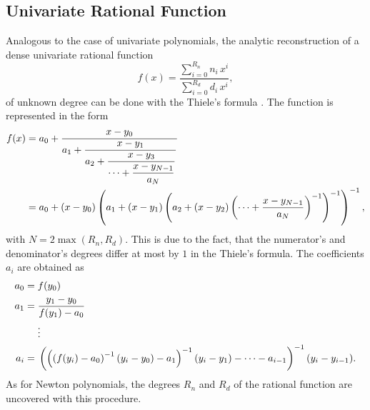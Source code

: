 {\subsection{Univariate Rational Function}
\label{sec:thiele}

Analogous to the case of univariate polynomials,
the analytic reconstruction of a dense univariate rational function 
\begin{equation} \label{eq:defuratfun}
  f(x) = \frac{\sum_{i=0}^{R_n} n_i\, x^i}{\sum_{i=0}^{R_d} d_{i}\, x^{i}},
\end{equation}
of unknown degree can be done with the Thiele's formula  \cite{Abramowitz1964}.
The function is represented in the form
\begin{align} \label{eq:thielerep}
  f(x) = {} & a_0 + \dfrac{x-y_0}{a_1 + \dfrac{x-y_1}{a_2 + \dfrac{x-y_3}{\cdots + \dfrac{x-y_{N-1}}{a_N}}}} \\
       = {} & a_0 + (x-y_0)\left(a_1 + (x-y_1)\left( a_2 + (x-y_2) \left(\cdots+ \frac{x-y_{N-1}}{a_N}\right)^{-1} \right)^{-1} \right)^{-1},
\end{align}
with $N = 2\max(R_n,R_d)$.
This is due to the fact, that the numerator's and denominator's degrees differ at most by $1$ in the Thiele's formula.
The coefficients $a_i$ are obtained as
\begin{align*} %
  a_0 ={}& f(y_0) \nn
  a_1 = {} & \frac{y_1-y_0}{f(y_1)-a_0} \nn
  & \vdots{} \\
  a_i = {} & \left(\left(\left(f(y_i)-a_0\right)^{-1}(y_i-y_0)-a_1\right)^{-1} (y_i-y_1)-\cdots -a_{i-1}\right)^{-1} (y_i-y_{i-1}).
\end{align*}
As for Newton polynomials, the degrees $R_n$ and $R_d$ of the rational function are uncovered with this procedure.


}
